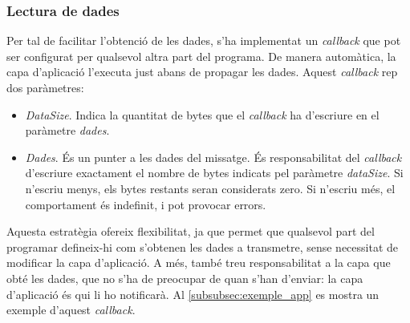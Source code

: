 \documentclass{tfgitic}[2024/07/01]
\begin{document}
{\subsubsection{Lectura de dades}
Per tal de facilitar l'obtenció de les dades, s'ha implementat un \emph{callback} que pot ser configurat per qualsevol altra part del programa. De manera automàtica, la capa d'aplicació l'executa just abans de propagar les dades. Aquest \emph{callback} rep dos paràmetres:
\begin{itemize}
    \item \emph{DataSize}. Indica la quantitat de bytes que el \emph{callback} ha d'escriure en el paràmetre \emph{dades}.
    \item \emph{Dades}. És un punter a les dades del missatge. És responsabilitat del \emph{callback} d'escriure exactament el nombre de bytes indicats pel paràmetre \emph{dataSize}. Si n'escriu menys, els bytes restants seran considerats zero. Si n'escriu més, el comportament és indefinit, i pot provocar errors.
\end{itemize}

Aquesta estratègia ofereix flexibilitat, ja que permet que qualsevol part del programar defineix-hi com s'obtenen les dades a transmetre, sense necessitat de modificar la capa d'aplicació. A més, també treu responsabilitat a la capa que obté les dades, que no s'ha de preocupar de quan s'han d'enviar: la capa d'aplicació és qui li ho notificarà. Al \autoref{subsubsec:exemple_app} es mostra un exemple d'aquest \emph{callback}.

}
\end{document}

